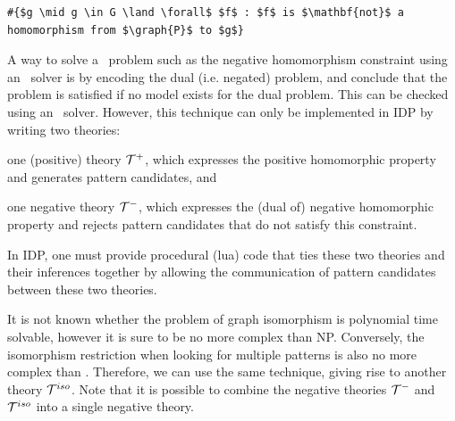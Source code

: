 \vspace{-0.5em}
\begin{center}
\begin{minipage}{0.62\linewidth}
\begin{lstlisting}[mathescape, caption=Quantifying over functions outside the vocabulary, label=lst:universalquant]
#{$g \mid g \in G \land \forall$ $f$ : $f$ is $\mathbf{not}$ a homomorphism from $\graph{P}$ to $g$}
\end{lstlisting}
\end{minipage}
\end{center}
\vspace{-0.5em}

A way to solve a \coNP\ problem such as the negative homomorphism constraint using an \NP\ solver is by encoding the dual (i.e. negated) problem, and conclude that the problem is satisfied if no model exists for the dual problem.
This can be checked using an \NP\ solver.
However, this technique can only be implemented in IDP by writing two theories: 
\begin{compactitem}
\item one (positive) theory $\mathcal{T}^{+}$, which expresses the positive homomorphic property and generates pattern candidates, and
\item one negative theory $\mathcal{T}^{-}$, which expresses the (dual of) negative homomorphic property and rejects pattern candidates that do not satisfy this constraint.
\end{compactitem}
In IDP, one must provide procedural (lua) code that ties these two theories and their inferences together by allowing the communication of pattern candidates between these two theories.

It is not known whether the problem of graph isomorphism is polynomial time solvable,
however it is sure to be no more complex than NP.
Conversely, the isomorphism restriction when looking for multiple patterns is also no more complex than \coNP.
Therefore, we can use the same technique, giving rise to another theory $\mathcal{T}^{iso}$.
Note that it is possible to combine the negative theories $\mathcal{T}^{-}$ and $\mathcal{T}^{iso}$ into a single negative theory.



